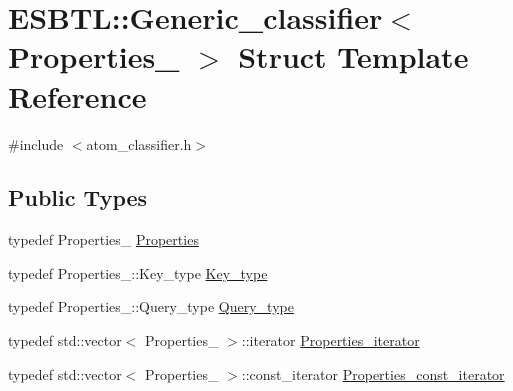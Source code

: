 \hypertarget{structESBTL_1_1Generic__classifier}{}\section{E\+S\+B\+TL\+:\+:Generic\+\_\+classifier$<$ Properties\+\_\+ $>$ Struct Template Reference}
\label{structESBTL_1_1Generic__classifier}


{\ttfamily \#include $<$atom\+\_\+classifier.\+h$>$}

\subsection*{Public Types}
\begin{DoxyCompactItemize}
\item 
typedef Properties\+\_\+ \hyperlink{structESBTL_1_1Generic__classifier_aef70ade88efad6f1819bfd389b925ac9}{Properties}
\item 
typedef Properties\+\_\+\+::\+Key\+\_\+type \hyperlink{structESBTL_1_1Generic__classifier_aa973891ce9d50ffc967a777a6fa67218}{Key\+\_\+type}
\item 
typedef Properties\+\_\+\+::\+Query\+\_\+type \hyperlink{structESBTL_1_1Generic__classifier_af7772b010c028daaec09d6a3f556894d}{Query\+\_\+type}
\item 
typedef std\+::vector$<$ Properties\+\_\+ $>$\+::iterator \hyperlink{structESBTL_1_1Generic__classifier_a5f82ff1a1ee75714d393ded0c3824fe6}{Properties\+\_\+iterator}
\item 
typedef std\+::vector$<$ Properties\+\_\+ $>$\+::const\+\_\+iterator \hyperlink{structESBTL_1_1Generic__classifier_aa2bfed4b529df9cbc252bacf20a15174}{Properties\+\_\+const\+\_\+iterator}
\end{DoxyCompactItemize}
